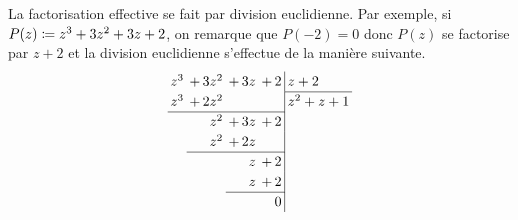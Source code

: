 \documentclass{magnolia}
\begin{document}
  \begin{remarques}
  \remarque La factorisation
  effective se fait par division euclidienne. Par exemple, si $P(z)\coloneqq z^3+3z^2+3z+2$, on
  remarque que $P(-2)=0$ donc $P(z)$ se factorise par $z+2$ et la division euclidienne s'effectue de la manière
  suivante.
  \begin{equation*}
  \renewcommand{\arraystretch}{1.2}
  \renewcommand{\arraycolsep}{2pt}
  \begin{array}{rrrr|l}
  z^3 & +\,3z^2 & +\,3z & +\,2 & z + 2 \\
  \cline{5-5}
  z^3 & +\,2z^2 &   &  & z^2+z+1 \\
  \cline{1-4}
      & z^2 &  +\,3z & +\,2 &     \\
      & z^2 & +\,2z &  &   \\
      \cline{2-4}
      &     & z & +\,2 &   \\
      &     & z & +\,2 &    \\
                \cline{3-4}
      &     &   &0&   
  \end{array}
  \end{equation*}
  

\end{remarques}
\end{document}
